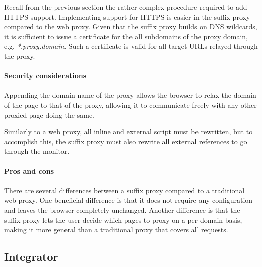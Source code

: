 \documentclass{llncs}
\begin{document}



Recall from the previous section the rather complex procedure required to add HTTPS support.
Implementing support for HTTPS is easier in the suffix proxy compared to the web proxy. 
Given that the suffix proxy builds on DNS wildcards, it is sufficient to issue a certificate
for the all subdomains of the proxy domain, e.g. \emph{*.proxy.domain}. Such a 
certificate is valid for all target URLs relayed through the proxy.


\paragraph{Security considerations}

Appending the domain name of the proxy allows the browser to relax the domain of the page to that of the proxy, allowing it to communicate freely with any other proxied page doing the same.

Similarly to a web proxy, all inline and external script must be rewritten, but to accomplish this, the suffix proxy must also rewrite all external references to go through the monitor.

\paragraph{Pros and cons}




There are several differences between a suffix proxy compared to a traditional 
web proxy. One beneficial difference is that it does not require any configuration and leaves the browser 
completely unchanged. Another difference is that the suffix proxy lets the user decide which pages to proxy on a 
per-domain basis, making it more general than a traditional proxy that covers 
all requests. 


\subsection{Integrator}

\end{document}
